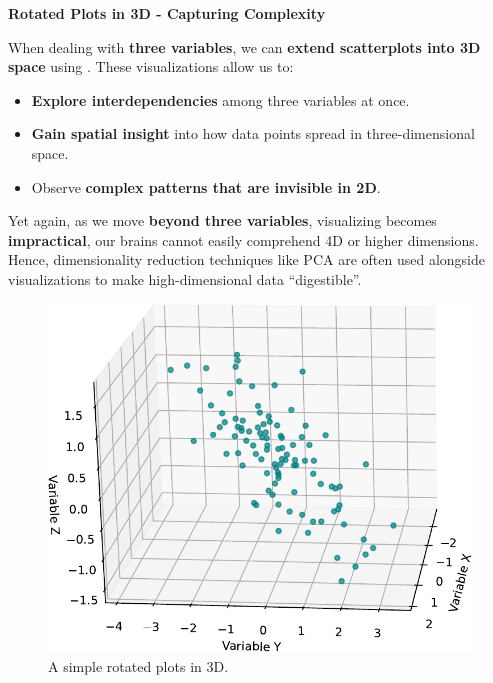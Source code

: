 \newpage

\begin{flushleft}
    \textcolor{Green3}{ \textbf{Rotated Plots in 3D - Capturing Complexity}}
\end{flushleft}
When dealing with \textbf{three variables}, we can \textbf{extend scatterplots into 3D space} using . These visualizations allow us to:
\begin{itemize}[label=\textcolor{Green3}{}]
    \item \textbf{Explore interdependencies} among three variables at once.
    \item \textbf{Gain spatial insight} into how data points spread in three-dimensional space.
    \item Observe \textbf{complex patterns that are invisible in 2D}.
\end{itemize}
Yet again, as we move \textbf{beyond three variables}, visualizing becomes \textbf{impractical}, our brains cannot easily comprehend 4D or higher dimensions. Hence, dimensionality reduction techniques like PCA are often used alongside visualizations to make high-dimensional data ``digestible''.

\begin{figure}[!htp]
    \centering
    \includegraphics[width=.8\textwidth]{img/rotated-plots.pdf}
    \caption{A simple rotated plots in 3D.}
\end{figure}

\newpage

